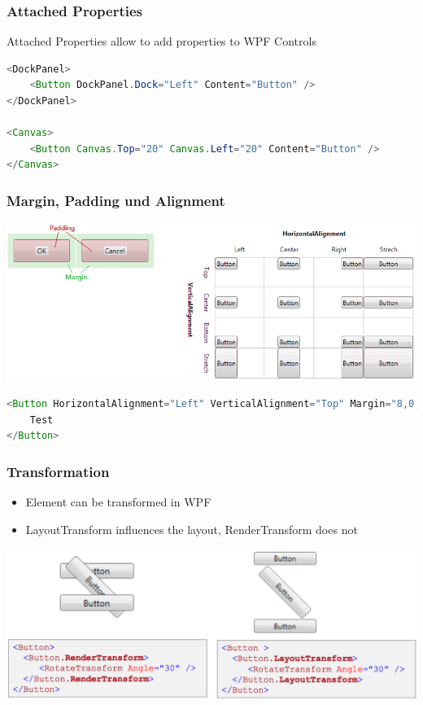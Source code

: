 \documentclass[10pt]{article}
\begin{document}
\subsubsection{Attached Properties}
Attached Properties allow to add properties to WPF Controls
\begin{lstlisting}[language=Java, caption=Attached Properties, style=JavaStyle]
<DockPanel>
	<Button DockPanel.Dock="Left" Content="Button" />
</DockPanel>

<Canvas>
	<Button Canvas.Top="20" Canvas.Left="20" Content="Button" />
</Canvas>
\end{lstlisting}
\subsubsection{Margin, Padding und Alignment}
\begin{center}
	\includegraphics[scale=0.3]{xaml_alignement.png}
\end{center}
\begin{lstlisting}[language=Java, caption=Alignment, style=JavaStyle]
<Button HorizontalAlignment="Left" VerticalAlignment="Top" Margin="8,0,8,8" >
    Test
</Button>
\end{lstlisting}
\subsubsection{Transformation}
\begin{itemize}
	\item Element can be transformed in WPF
	\item LayoutTransform influences the layout, RenderTransform does not
\end{itemize}
\begin{center}
	\includegraphics[scale=0.3]{xaml_rendering.png}
\end{center}
\end{document}
